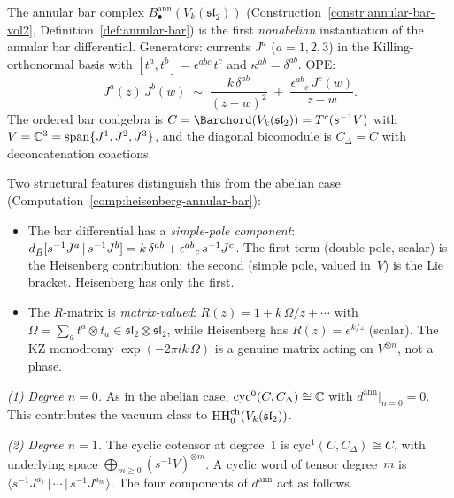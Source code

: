 \begin{computation}%
\label{comp:affine-sl2-annular-bar}%
%
%
%
The annular bar complex
$B^{\mathrm{ann}}_\bullet(V_k(\mathfrak{sl}_2))$
(Construction~\ref{constr:annular-bar-vol2},
Definition~\ref{def:annular-bar}) is the first
\emph{nonabelian} instantiation of the annular bar
differential. Generators: currents $J^a$ ($a=1,2,3$)
in the Killing-orthonormal basis with
$[t^a, t^b] = \epsilon^{abc}\, t^c$ and
$\kappa^{ab} = \delta^{ab}$. OPE:
\begin{equation}\label{eq:sl2-ann-ope}
J^a(z)\, J^b(w)
\;\sim\;
\frac{k\,\delta^{ab}}{(z-w)^2}
\;+\;
\frac{\epsilon^{ab}{}_c\, J^c(w)}{z-w}.
\end{equation}
The ordered bar coalgebra is $C = \Barchord(V_k(\mathfrak{sl}_2))
= T^c(s^{-1}V)$ with $V = \mathbb{C}^3 = \mathrm{span}\{J^1,J^2,J^3\}$,
and the diagonal bicomodule is $C_\Delta = C$
with deconcatenation coactions.

Two structural features distinguish this from the
abelian case (Computation~\ref{comp:heisenberg-annular-bar}):
\begin{itemize}
\item The bar differential has a \emph{simple-pole component}:
 $d_{\bar{B}}[s^{-1}J^a\,|\,s^{-1}J^b]
 = k\,\delta^{ab} + \epsilon^{ab}{}_c\, s^{-1}J^c$.
 The first term (double pole, scalar) is the Heisenberg
 contribution; the second (simple pole, valued in~$V$)
 is the Lie bracket. Heisenberg has only the first.
\item The $R$-matrix is \emph{matrix-valued}:
 $R(z) = 1 + k\,\Omega/z + \cdots$ with
 $\Omega = \sum_a t^a \otimes t_a \in
 \mathfrak{sl}_2 \otimes \mathfrak{sl}_2$,
 while Heisenberg has $R(z) = e^{k/z}$ (scalar).
 The KZ monodromy $\exp(-2\pi ik\,\Omega)$ is a
 genuine matrix acting on $V^{\otimes n}$, not a phase.
\end{itemize}

\smallskip
\noindent
\emph{(1) Degree $n=0$.}
As in the abelian case,
$\mathrm{cyc}^0(C,C_\Delta) \cong \mathbb{C}$
with $d^{\mathrm{ann}}|_{n=0} = 0$. This contributes the
vacuum class to $\operatorname{HH}^{\mathrm{ch}}_0(V_k(\mathfrak{sl}_2))$.

\smallskip
\noindent
\emph{(2) Degree $n=1$.}
The cyclic cotensor at degree~$1$ is
$\mathrm{cyc}^1(C,C_\Delta) \cong C$,
with underlying space
$\bigoplus_{m \ge 0} (s^{-1}V)^{\otimes m}$.
A cyclic word of tensor degree~$m$ is
$\langle s^{-1}J^{a_1}\,|\,\cdots\,|\,s^{-1}J^{a_m}\rangle$.
The four components of $d^{\mathrm{ann}}$ act as follows.


\end{computation}
